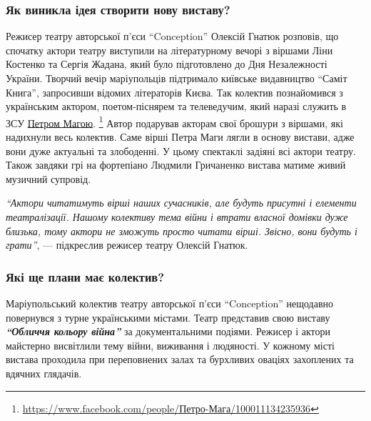 
\subsubsection{Як виникла ідея створити нову виставу?}


Режисер театру авторської п'єси \enquote{Conception} Олексій Гнатюк розповів, що
спочатку актори театру виступили на літературному вечорі з віршами Ліни
Костенко та Сергія Жадана, який було підготовлено до Дня Незалежності України.
Творчий вечір маріупольців підтримало київське видавництво \enquote{Саміт Книга},
запросивши відомих літераторів Києва. Так колектив познайомився з українським
актором, поетом-піснярем та телеведучим, який наразі служить в ЗСУ \href{https://www.facebook.com/people/Петро-Мага/100011134235936}{Петром
Магою}.%
\footnote{\url{https://www.facebook.com/people/Петро-Мага/100011134235936}} %
Автор подарував акторам свої брошури з віршами, які надихнули весь
колектив. Саме вірші Петра Маги лягли в основу вистави, адже вони дуже
актуальні та злободенні. У цьому спектаклі задіяні всі актори театру. Також
завдяки грі на фортепіано Людмили Гричаненко вистава матиме живий музичний
супровід.

\begin{leftbar}
\emph{\enquote{Актори читатимуть вірші наших сучасників, але будуть присутні і елементи
театралізації. Нашому колективу тема війни і втрати власної домівки
дуже близька, тому актори не зможуть просто читати вірші. Звісно, вони
будуть і грати}}, — підкреслив режисер театру Олексій Гнатюк.
\end{leftbar}


\subsubsection{Які ще плани має колектив?}


Маріупольський колектив театру авторської п'єси \enquote{Conception} нещодавно
повернувся з турне українськими містами. Театр представив свою виставу \textbf{\emph{\enquote{Обличчя
кольору війна}}} за документальними подіями. Режисер і актори майстерно
висвітлили тему війни, виживання і людяності. У кожному місті вистава проходила
при переповнених залах та бурхливих оваціях захоплених та вдячних глядачів.

